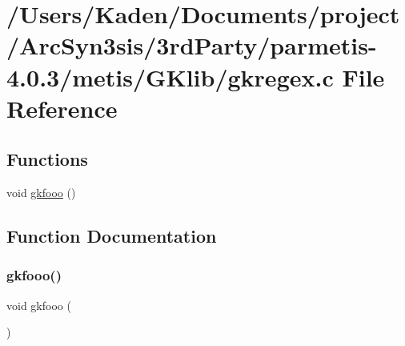 \hypertarget{a00089}{}\section{/\+Users/\+Kaden/\+Documents/project/\+Arc\+Syn3sis/3rd\+Party/parmetis-\/4.0.3/metis/\+G\+Klib/gkregex.c File Reference}
\label{a00089}
\subsection*{Functions}
\begin{DoxyCompactItemize}
\item 
void \hyperlink{a00089_a9f14e34dd94536974509bad2ab7f8c95}{gkfooo} ()
\end{DoxyCompactItemize}


\subsection{Function Documentation}
\mbox{\label{a00089_a9f14e34dd94536974509bad2ab7f8c95}} 
\subsubsection{\texorpdfstring{gkfooo()}{gkfooo()}}
{\footnotesize\ttfamily void gkfooo (\begin{DoxyParamCaption}{ }\end{DoxyParamCaption})}

